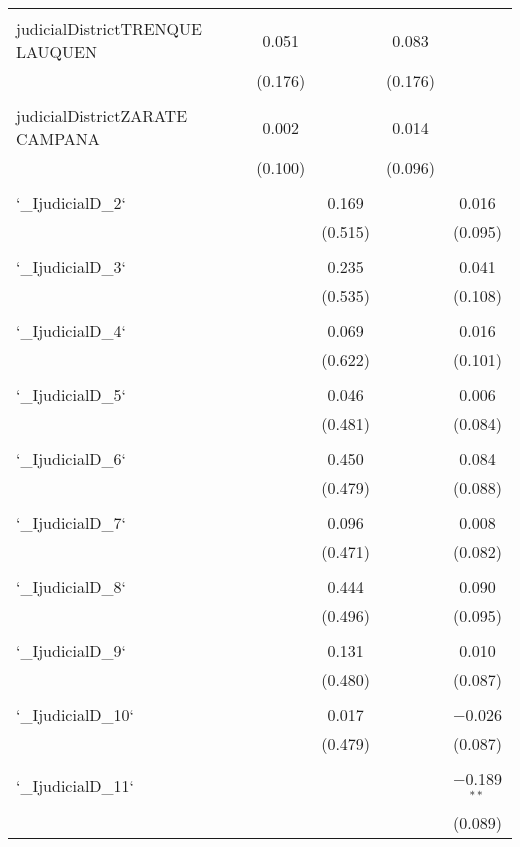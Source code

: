 \documentclass{article}
\begin{document}
\begin{table}[!htbp]
{\begin{tabular}{@{\extracolsep{5pt}}lccccc}
  & & & & & \\ 
 judicialDistrictTRENQUE LAUQUEN &  & 0.051 &  & 0.083 &  \\ 
  &  & (0.176) &  & (0.176) &  \\ 
  & & & & & \\ 
 judicialDistrictZARATE CAMPANA &  & 0.002 &  & 0.014 &  \\ 
  &  & (0.100) &  & (0.096) &  \\ 
  & & & & & \\ 
 `\_IjudicialD\_2` &  &  & 0.169 &  & 0.016 \\ 
  &  &  & (0.515) &  & (0.095) \\ 
  & & & & & \\ 
 `\_IjudicialD\_3` &  &  & 0.235 &  & 0.041 \\ 
  &  &  & (0.535) &  & (0.108) \\ 
  & & & & & \\ 
 `\_IjudicialD\_4` &  &  & 0.069 &  & 0.016 \\ 
  &  &  & (0.622) &  & (0.101) \\ 
  & & & & & \\ 
 `\_IjudicialD\_5` &  &  & 0.046 &  & 0.006 \\ 
  &  &  & (0.481) &  & (0.084) \\ 
  & & & & & \\ 
 `\_IjudicialD\_6` &  &  & 0.450 &  & 0.084 \\ 
  &  &  & (0.479) &  & (0.088) \\ 
  & & & & & \\ 
 `\_IjudicialD\_7` &  &  & 0.096 &  & 0.008 \\ 
  &  &  & (0.471) &  & (0.082) \\ 
  & & & & & \\ 
 `\_IjudicialD\_8` &  &  & 0.444 &  & 0.090 \\ 
  &  &  & (0.496) &  & (0.095) \\ 
  & & & & & \\ 
 `\_IjudicialD\_9` &  &  & 0.131 &  & 0.010 \\ 
  &  &  & (0.480) &  & (0.087) \\ 
  & & & & & \\ 
 `\_IjudicialD\_10` &  &  & 0.017 &  & $-$0.026 \\ 
  &  &  & (0.479) &  & (0.087) \\ 
  & & & & & \\ 
 `\_IjudicialD\_11` &  &  &  &  & $-$0.189$^{**}$ \\ 
  &  &  &  &  & (0.089) \\ 

\end{tabular}}
\end{table}
\end{document}
